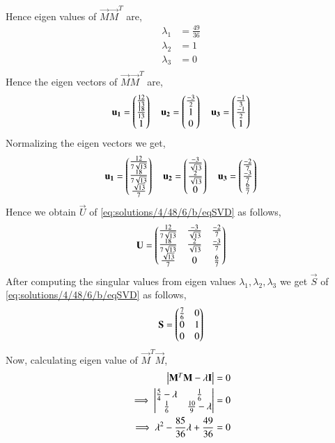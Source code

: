 Hence eigen values of $\vec{M}\vec{M}^T$ are,
\begin{align}
\lambda_1 &= \frac{49}{36}\\
\lambda_2 &= 1\\
\lambda_3 &= 0\\
\end{align}
Hence the eigen vectors of $\vec{M}\vec{M}^T$ are,
\begin{align}
\mathbf{u_1}=\begin{pmatrix}\frac{12}{13}\\\frac{18}{13}\\1\end{pmatrix}\quad
\mathbf{u_2}=\begin{pmatrix}\frac{-3}{2}\\1\\0\end{pmatrix}\quad
\mathbf{u_3}=\begin{pmatrix}\frac{-1}{3}\\\frac{-1}{2}\\1\end{pmatrix}
\end{align}
{Normalizing the eigen vectors we get,}
\begin{align}
\mathbf{u_1}=\begin{pmatrix}\frac{12}{7\sqrt{13}}\\\frac{18}{7\sqrt{13}}\\\frac{\sqrt{13}}{7}\end{pmatrix}\quad
\mathbf{u_2}=\begin{pmatrix}\frac{-3}{\sqrt{13}}\\\frac{2}{\sqrt{13}}\\0\end{pmatrix}\quad
\mathbf{u_3}=\begin{pmatrix}\frac{-2}{7}\\\frac{-3}{7}\\\frac{6}{7}\end{pmatrix}
\end{align}
Hence we obtain $\vec{U}$ of \eqref{eq:solutions/4/48/6/b/eqSVD} as follows,
\begin{align}
\mathbf{U}=\begin{pmatrix}\frac{12}{7\sqrt{13}}&\frac{-3}{\sqrt{13}}&\frac{-2}{7}\\\frac{18}{7\sqrt{13}}&\frac{2}{\sqrt{13}}&\frac{-3}{7}\\\frac{\sqrt{13}}{7}&0&\frac{6}{7}\end{pmatrix}\label{eq:solutions/4/48/6/b/eqU}
\end{align}
After computing the singular values from eigen values $\lambda_1, \lambda_2, \lambda_3$ we get $\vec{S}$ of \eqref{eq:solutions/4/48/6/b/eqSVD} as follows,
\begin{align}
\mathbf{S}=\begin{pmatrix}\frac{7}{6}&0\\0&1\\0&0\end{pmatrix}\label{eq:solutions/4/48/6/b/eqS}
\end{align}
Now, calculating eigen value of $\vec{M}^T\vec{M}$,
\begin{align}
\begin{vmatrix}\mathbf{M}^T\mathbf{M} - \lambda\mathbf{I}\end{vmatrix} &= 0\\
\implies\begin{vmatrix}\frac{5}{4}-\lambda&\frac{1}{6}\\\frac{1}{6}&\frac{10}{9}-\lambda\end{vmatrix} &=0\\
\implies\lambda^2-\frac{85}{36}\lambda+\frac{49}{36} &=0
\end{align}

